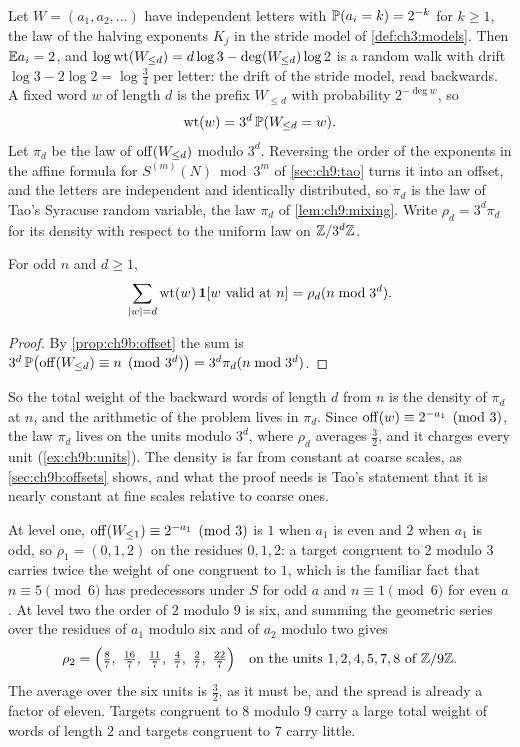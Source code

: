 Let $W=(a_1,a_2,\ldots)$ have independent letters with $\mathbb{P}(a_i=k)=2^{-k}$ for $k\ge1$, the law of the halving exponents $K_j$ in the stride model of \cref{def:ch3:models}. Then $\mathbb{E} a_i=2$, and $\log\operatorname{wt}(W_{\le d})=d\log3-\deg(W_{\le d})\log2$ is a random walk with drift $\log3-2\log2=\log\frac34$ per letter: the drift of the stride model, read backwards. A fixed word $w$ of length $d$ is the prefix $W_{\le d}$ with probability $2^{-\deg w}$, so
\[
  \operatorname{wt}(w)=3^d\,\mathbb{P}(W_{\le d}=w) .
\]
Let $\pi_d$ be the law of $\operatorname{off}(W_{\le d})$ modulo $3^d$. Reversing the order of the exponents in the affine formula for $S^{(m)}(N)\bmod3^m$ of \cref{sec:ch9:tao} turns it into an offset, and the letters are independent and identically distributed, so $\pi_d$ is the law of Tao's Syracuse random variable, the law $\pi_d$ of \cref{lem:ch9:mixing}. Write $\rho_d=3^d\pi_d$ for its density with respect to the uniform law on $\mathbb{Z}/3^d\mathbb{Z}$.

\begin{proposition}\label{prop:ch9b:density}
For odd $n$ and $d\ge1$,
\[
  \sum_{|w|=d}\operatorname{wt}(w)\,\mathbf 1[w\text{ valid at }n]=\rho_d(n\bmod3^d) .
\]
\end{proposition}

\begin{proof}
By \cref{prop:ch9b:offset} the sum is $3^d\,\mathbb{P}\bigl(\operatorname{off}(W_{\le d})\equiv n\pmod{3^d}\bigr)=3^d\pi_d(n\bmod3^d)$.
\end{proof}

So the total weight of the backward words of length $d$ from $n$ is the density of $\pi_d$ at $n$, and the arithmetic of the problem lives in $\pi_d$. Since $\operatorname{off}(w)\equiv2^{-a_1}\pmod3$, the law $\pi_d$ lives on the units modulo $3^d$, where $\rho_d$ averages $\frac32$, and it charges every unit (\cref{ex:ch9b:units}). The density is far from constant at coarse scales, as \cref{sec:ch9b:offsets} shows, and what the proof needs is Tao's statement that it is nearly constant at fine scales relative to coarse ones.

\begin{example}\label{ex:ch9b:rhotwo}
At level one, $\operatorname{off}(W_{\le1})\equiv2^{-a_1}\pmod3$ is $1$ when $a_1$ is even and $2$ when $a_1$ is odd, so $\rho_1=(0,1,2)$ on the residues $0,1,2$: a target congruent to $2$ modulo $3$ carries twice the weight of one congruent to $1$, which is the familiar fact that $n\equiv5\pmod6$ has predecessors under $S$ for odd $a$ and $n\equiv1\pmod6$ for even $a$. At level two the order of $2$ modulo $9$ is six, and summing the geometric series over the residues of $a_1$ modulo six and of $a_2$ modulo two gives
\[
  \rho_2=\Bigl(\tfrac87,\ \tfrac{16}7,\ \tfrac{11}7,\ \tfrac47,\ \tfrac27,\ \tfrac{22}7\Bigr)\quad\text{on the units }1,2,4,5,7,8\ \text{of }\Z/9\Z .
\]
The average over the six units is $\tfrac32$, as it must be, and the spread is already a factor of eleven. Targets congruent to $8$ modulo $9$ carry a large total weight of words of length $2$ and targets congruent to $7$ carry little.
\end{example}


